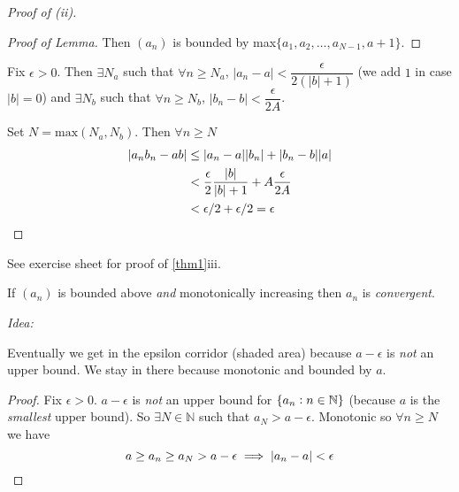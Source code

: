 \begin{proof}[Proof of (ii)]
\begin{proof}[Proof of Lemma]
Then $(a_n)$ is bounded by max$\{a_1,a_2,\dots,a_{N-1},a+1\}$.
\end{proof}


Fix $\epsilon >0$. Then $\exists N_a$ such that $\forall n \geq N_a$, $|a_n - a| < \dfrac{\epsilon}{2(|b| + 1)}$ (we add $1$ in case $|b| = 0$)
and $\exists N_b$ such that $\forall n \geq N_b$, $|b_n - b| < \dfrac{\epsilon}{2A}$. 

Set $N = \text{max}(N_a,N_b)$. Then $\forall n \geq N$
\[\begin{aligned}|a_nb_n -ab| &\leq |a_n-a||b_n| + |b_n-b||a|\\ 
&< \frac{\epsilon}{2}\frac{|b|}{|b|+1} + A\frac{\epsilon}{2A}\\ 
& < \epsilon/2 + \epsilon/2 = \epsilon\qedhere	
\end{aligned}
\]
\end{proof}

See exercise sheet for proof of \ref{thm1}iii.\\

\begin{theorem}
If $(a_n)$ is bounded above \emph{and} monotonically increasing then $a_n$ is \emph{convergent}.
\end{theorem}

\emph{Idea:} 
\begin{center}
\end{center}
Eventually we get in the epsilon corridor (shaded area) because $a-\epsilon$ is \emph{not} an upper bound. We stay in there because monotonic and bounded by $a$.
\begin{proof}
Fix $\epsilon >0$. $a-\epsilon$ is \emph{not} an upper bound for $\{a_n : n \in\mathbb{N}\}$ (because $a$ is the \emph{smallest} upper bound). So $\exists N \in \mathbb{N}$ such that $a_N > a-\epsilon$. Monotonic so $\forall n \geq N$ we have \[a\geq a_n\geq a_N > a-\epsilon \implies |a_n - a| < \epsilon\qedhere\]	
\end{proof}~

